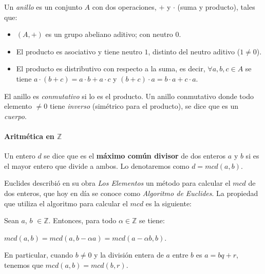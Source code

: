 \begin{definition}
	Un \textit{anillo} es un conjunto $A$ con dos operaciones, $+$ y $\cdot$ (suma y producto), tales que:
	\begin{itemize}
		\item $(A,+)$ es un grupo abeliano aditivo; con neutro $0$.
		\item El producto es asociativo y tiene neutro $1$, distinto del neutro aditivo ($1\neq 0$).
		\item El producto es distributivo con respecto a la suma, es decir, $\forall a,b,c \in A$ se tiene $a\cdot(b+c)=a\cdot b + a\cdot c$ y $(b+c)\cdot a = b\cdot a + c\cdot a$.
	\end{itemize}

	El anillo es \textit{conmutativo} si lo es el producto. Un anillo conmutativo donde todo elemento $\neq 0$ tiene \textit{inverso} (simétrico para el producto), se dice que es un \textit{cuerpo}.
	
\end{definition}


\hfil


\paragraph{Aritmética en $\mathbb{Z}$}

\begin{definition}
	Un entero $d$ se dice que es el \textbf{máximo común divisor} de dos enteros $a$ y $b$ si es el mayor entero que divide a ambos. Lo denotaremos como $d=mcd(a,b)$.
\end{definition}

\hfil

Euclides describió en su obra \textit{Los Elementos} un método para calcular el $mcd$ de dos enteros, que hoy en día se conoce como \textit{Algoritmo de Euclides}. La propiedad que utiliza el algoritmo para calcular el $mcd$ es la siguiente:



\begin{proposition}
	Sean $a$, $b$ $\in \mathbb{Z}$. Entonces, para todo $\alpha \in \mathbb{Z}$ se tiene:
	\begin{center}
		$mcd(a,b) = mcd(a, b-\alpha a) = mcd(a-\alpha b, b).$
	\end{center}
	En particular, cuando $b \neq 0$ y la división entera de $a$ entre $b$ es $a = bq + r$, tenemos que $mcd(a,b) = mcd(b, r)$.
\end{proposition}

